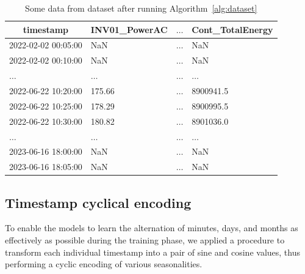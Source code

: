 \begin{table}[H]
	\begin{center}
		\begin{tabular}[c]{l|l|l|l}
			\hline
			\multicolumn{1}{c|}{\textbf{timestamp}}      &
			\multicolumn{1}{c|}{\textbf{INV01\_PowerAC}} &
			\multicolumn{1}{c|}{\textbf{$\ldots$}}       &
			\multicolumn{1}{c}{\textbf{Cont\_TotalEnergy}}                                 \\
			\hline
			2022-02-02 00:05:00                          & NaN      & $\ldots$ & NaN       \\
			2022-02-02 00:10:00                          & NaN      & $\ldots$ & NaN       \\
			$\ldots$                                     & $\ldots$ & $\ldots$ & $\ldots$  \\
			2022-06-22 10:20:00                          & 175.66   & $\ldots$ & 8900941.5 \\
			2022-06-22 10:25:00                          & 178.29   & $\ldots$ & 8900995.5 \\
			2022-06-22 10:30:00                          & 180.82   & $\ldots$ & 8901036.0 \\
			$\ldots$                                     & $\ldots$ & $\ldots$ & $\ldots$  \\
			2023-06-16 18:00:00                          & NaN      & $\ldots$ & NaN       \\
			2023-06-16 18:05:00                          & NaN      & $\ldots$ & NaN       \\
		\end{tabular}
	\end{center}
	\caption{Some data from dataset after running Algorithm~\ref{alg:dataset}}\label{tab:datasetfinalvalues}
\end{table}

\subsection{Timestamp cyclical encoding}
To enable the models to learn the alternation of minutes, days,
and months as effectively as possible during the training phase,
we applied a procedure to transform each individual timestamp into
a pair of sine and cosine values, thus performing a cyclic
encoding of various seasonalities.



